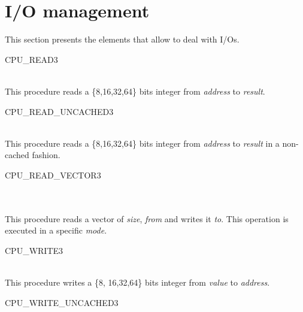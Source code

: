 \skipoff
\section {I/O management}
This section presents the elements that allow to deal with I/Os.
\skipon

\begin{procedure}{CPU\_READ}{3}
	\\
	\\
\end{procedure}

This procedure reads a \{8,16,32,64\} bits integer from \emph {address}
to \emph {result}.

\begin{procedure}{CPU\_READ\_UNCACHED}{3}
	\\
	\\
\end{procedure}

This procedure reads a \{8,16,32,64\} bits integer from \emph {address}
to \emph {result} in a non-cached fashion.

\begin{procedure}{CPU\_READ\_VECTOR}{3}
	\\
	\\
	\\
\end{procedure}

This procedure reads a vector of \emph{size}, \emph{from} and writes
it \emph{to}. This operation is executed in a specific \emph{mode}.

\begin{procedure}{CPU\_WRITE}{3}
	\\
	\\
\end{procedure}

This procedure writes a \{8, 16,32,64\} bits integer from \emph {value}
to \emph {address}.

\begin{procedure}{CPU\_WRITE\_UNCACHED}{3}
	\\
	\\
\end{procedure}

